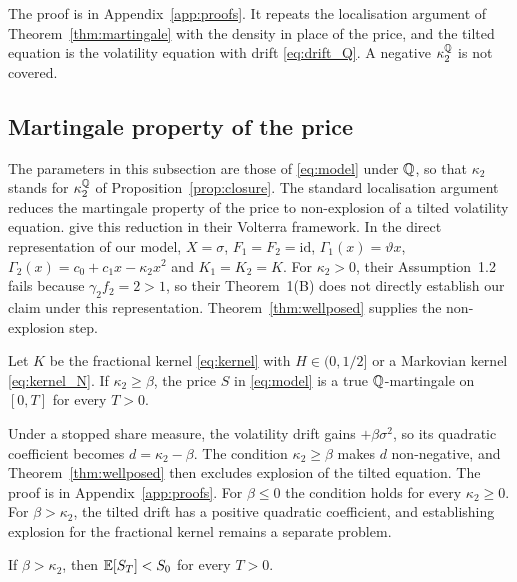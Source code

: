 The proof is in Appendix~\ref{app:proofs}. It repeats the localisation argument of Theorem~\ref{thm:martingale} with the density in place of the price, and the tilted equation is the volatility equation with drift \eqref{eq:drift_Q}. A negative $\kappa_2^{\mathbb{Q}}$ is not covered.

\subsection{Martingale property of the price}

The parameters in this subsection are those of \eqref{eq:model} under $\mathbb{Q}$, so that $\kappa_2$ stands for $\kappa_2^{\mathbb{Q}}$ of Proposition~\ref{prop:closure}. The standard localisation argument reduces the martingale property of the price to non-explosion of a tilted volatility equation. \citet[Lemma~3.1]{GuyonJeanninJourdain2026} give this reduction in their Volterra framework. In the direct representation of our model, $X=\sigma$, $F_1=F_2=\mathrm{id}$, $\Gamma_1(x)=\vartheta x$, $\Gamma_2(x)=c_0+c_1x-\kappa_2x^2$ and $K_1=K_2=K$. For $\kappa_2>0$, their Assumption~1.2 fails because $\gamma_2f_2=2>1$, so their Theorem~1(B) does not directly establish our claim under this representation. Theorem~\ref{thm:wellposed} supplies the non-explosion step.

\begin{theorem}\label{thm:martingale}
Let $K$ be the fractional kernel \eqref{eq:kernel} with $H\in(0,1/2]$ or a Markovian kernel \eqref{eq:kernel_N}. If $\kappa_2\ge\beta$, the price $S$ in \eqref{eq:model} is a true $\mathbb{Q}$-martingale on $[0,T]$ for every $T>0$.
\end{theorem}

Under a stopped share measure, the volatility drift gains $+\beta\sigma^2$, so its quadratic coefficient becomes $d=\kappa_2-\beta$. The condition $\kappa_2\ge\beta$ makes $d$ non-negative, and Theorem~\ref{thm:wellposed} then excludes explosion of the tilted equation. The proof is in Appendix~\ref{app:proofs}. For $\beta\le0$ the condition holds for every $\kappa_2\ge0$. For $\beta>\kappa_2$, the tilted drift has a positive quadratic coefficient, and establishing explosion for the fractional kernel remains a separate problem.

\begin{conjecture}\label{conj:supermartingale}
If $\beta>\kappa_2$, then $\mathbb{E}[S_T]<S_0$ for every $T>0$.
\end{conjecture}

